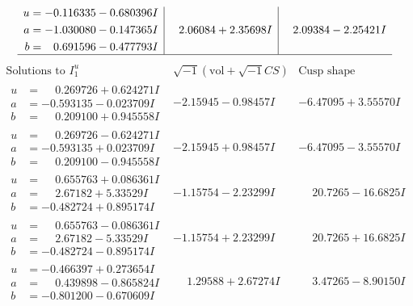 \documentclass[1p]{elsarticle_modified}
\theoremstyle{definition}
\newcommand{\I}{\sqrt{-1}}
\begin{document}
$$\begin{array}{c|c|c}
\begin{aligned}
u &= -0.116335 - 0.680396 I \\
a &= -1.030080 - 0.147365 I \\
b &= \phantom{-}0.691596 - 0.477793 I\end{aligned}
 & \phantom{-}2.06084 + 2.35698 I & \phantom{-}2.09384 - 2.25421 I\\
 \hline 
 \end{array}$$\newpage$$\begin{array}{c|c|c}  
\text{Solutions to }I^u_{1}& \I (\text{vol} + \sqrt{-1}CS) & \text{Cusp shape}\\
 \hline 
\begin{aligned}
u &= \phantom{-}0.269726 + 0.624271 I \\
a &= -0.593135 - 0.023709 I \\
b &= \phantom{-}0.209100 + 0.945558 I\end{aligned}
 & -2.15945 - 0.98457 I & -6.47095 + 3.55570 I \\ \hline\begin{aligned}
u &= \phantom{-}0.269726 - 0.624271 I \\
a &= -0.593135 + 0.023709 I \\
b &= \phantom{-}0.209100 - 0.945558 I\end{aligned}
 & -2.15945 + 0.98457 I & -6.47095 - 3.55570 I \\ \hline\begin{aligned}
u &= \phantom{-}0.655763 + 0.086361 I \\
a &= \phantom{-}2.67182 + 5.33529 I \\
b &= -0.482724 + 0.895174 I\end{aligned}
 & -1.15754 - 2.23299 I & \phantom{-}20.7265 - 16.6825 I \\ \hline\begin{aligned}
u &= \phantom{-}0.655763 - 0.086361 I \\
a &= \phantom{-}2.67182 - 5.33529 I \\
b &= -0.482724 - 0.895174 I\end{aligned}
 & -1.15754 + 2.23299 I & \phantom{-}20.7265 + 16.6825 I \\ \hline\begin{aligned}
u &= -0.466397 + 0.273654 I \\
a &= \phantom{-}0.439898 - 0.865824 I \\
b &= -0.801200 - 0.670609 I\end{aligned}
 & \phantom{-}1.29588 + 2.67274 I & \phantom{-}3.47265 - 8.90150 I \\ \hline\begin{aligned}

\end{aligned}
\end{array}$$
\end{document}
